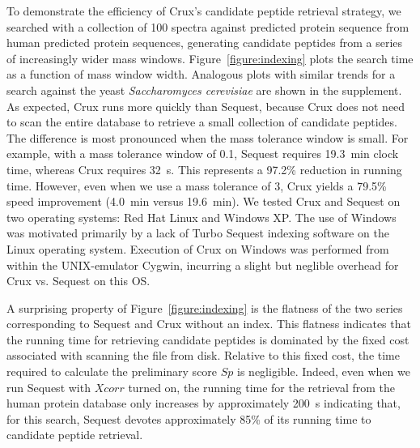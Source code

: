 \documentclass[12pt]{article}
\begin{document}


% 
%
% 
% 
% 
% 

To demonstrate the efficiency of Crux's candidate peptide retrieval
strategy, we searched with a collection of 100 spectra against
predicted protein sequence from human predicted protein sequences, generating
candidate peptides from a series of increasingly wider mass windows.
Figure~\ref{figure:indexing} plots the search time as a function of
mass window width. Analogous plots with similar trends for a search
against the yeast {\em Saccharomyces cerevisiae} are shown in the
supplement.
As expected, Crux runs more quickly than {\sc Sequest}, because Crux
does not need to scan the entire database to retrieve a small
collection of candidate peptides. The difference is most pronounced
when the mass tolerance window is small.  For example, with a mass
tolerance window of 0.1, {\sc Sequest} requires 19.3~min clock time,
whereas Crux requires 32~s.  This represents a 97.2\% reduction in
running time. However, even when we use a mass tolerance of 3, Crux
yields a 79.5\% speed improvement (4.0~min versus 19.6~min).
We tested Crux and {\sc Sequest} on two operating systems: Red Hat Linux and
Windows XP. The use of Windows was 
motivated primarily by a lack of Turbo Sequest indexing
software on the Linux operating system. Execution of 
Crux on Windows was performed
from within the UNIX-emulator Cygwin, 
incurring a slight but neglible overhead for Crux vs. {\sc
Sequest} on this OS.

A surprising property of Figure~\ref{figure:indexing} is the flatness
of the two series corresponding to {\sc Sequest} and Crux without an
index.  This flatness indicates that the running time for retrieving
candidate peptides is dominated by the fixed cost associated with
scanning the file from disk.  Relative to this fixed cost, the time
required to calculate the preliminary score $Sp$ is negligible.
Indeed, even when we run {\sc Sequest} with $Xcorr$ turned on, the
running time for the retrieval from the human protein database only
increases by approximately 200~s indicating that, for this search,
{\sc Sequest} devotes approximately 85\% of its running time to
candidate peptide retrieval.
\end{document}

